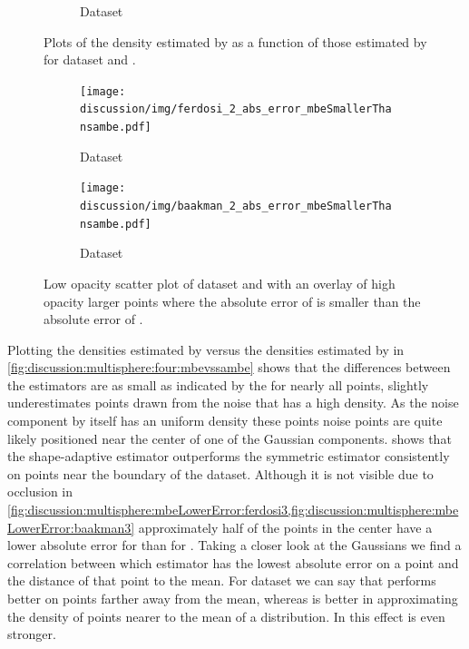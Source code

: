 \begin{figure}
\begin{subfigure}{0.23\textwidth}
			\caption{Dataset \baakmanTwo}
			\label{fig:discussion:multisphere:mbevssambe:baakman2}
		\end{subfigure}	
		\caption{Plots of the density estimated by \sambe as a function of those estimated by \mbe for dataset %
			\ferdosiTwo and %
			\baakmanTwo.
		}
		\label{fig:discussion:multisphere:two:mbevssambe}
	\end{figure}

	\begin{figure}
		\centering
		\begin{subfigure}{0.23\textwidth}
			\centering
			\texttt{[image: discussion/img/ferdosi\_2\_abs\_error\_mbeSmallerThansambe.pdf]}
			\caption{Dataset \ferdosiTwo}
			\label{fig:discussion:multisphere:mbeLowerError:ferdosi2}
		\end{subfigure}
		\begin{subfigure}{0.23\textwidth}
			\centering
			\texttt{[image: discussion/img/baakman\_2\_abs\_error\_mbeSmallerThansambe.pdf]}
			\caption{Dataset \baakmanTwo}
			\label{fig:discussion:multisphere:mbeLowerError:baakman2}
		\end{subfigure}	
		\caption{Low opacity scatter plot of dataset  \ferdosiTwo and  \baakmanTwo with an overlay of high opacity larger points where the absolute error of \mbe is smaller than the absolute error of \sambe.}
		\label{fig:discussion:multisphere:two:mbeLowerError}
	\end{figure}

	Plotting the densities estimated by \sambe versus the densities estimated by \mbe in \cref{fig:discussion:multisphere:four:mbevssambe} shows that the differences between the estimators are as small as indicated by the \mse for nearly all points, \sambe slightly underestimates points drawn from the noise that has a high density. As the noise component by itself has an uniform density these points noise points are quite likely positioned near the center of one of the Gaussian components.  shows that the shape-adaptive estimator outperforms the symmetric estimator consistently on points near the boundary of the dataset. Although it is not visible due to occlusion in \cref{fig:discussion:multisphere:mbeLowerError:ferdosi3,fig:discussion:multisphere:mbeLowerError:baakman3} approximately half of the points in the center have a lower absolute error for \sambe than for \mbe. Taking a closer look at the Gaussians we find a correlation between which estimator has the lowest absolute error on a point and the distance of that point to the mean. For dataset \ferdosiThree we can say that \sambe performs better on points farther away from the mean, whereas \mbe is better in approximating the density of points nearer to the mean of a distribution. In \baakmanThree this effect is even stronger. 

